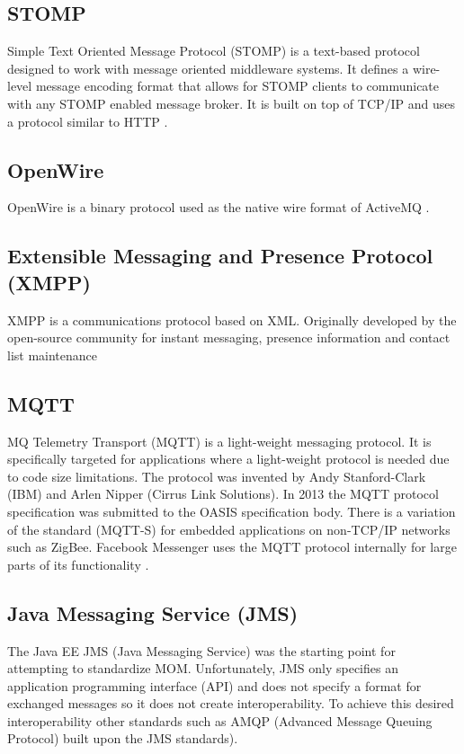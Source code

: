 \documentclass{thesis}
\begin{document}
\subsection{STOMP}
Simple Text Oriented Message Protocol (STOMP) is a text-based protocol designed to work with message oriented middleware systems.  It defines a wire-level message encoding format that allows for STOMP clients to communicate with any STOMP enabled message broker.  It is built on top of TCP/IP and uses a protocol similar to HTTP \cite{STOMP}.

\subsection{OpenWire}
OpenWire is a binary protocol used as the native wire format of ActiveMQ \cite{OPENWIRE}.

\subsection{Extensible Messaging and Presence Protocol (XMPP)}
XMPP is a communications protocol based on XML.  Originally developed by the open-source community for instant messaging, presence information and contact list maintenance \cite{XMPP}  

\subsection{MQTT}
MQ Telemetry Transport (MQTT) is a light-weight messaging protocol.  It is specifically targeted for applications where a light-weight protocol is needed due to code size limitations.  The protocol was invented by Andy Stanford-Clark (IBM) and Arlen Nipper (Cirrus Link Solutions).  In 2013 the MQTT protocol specification was submitted to the OASIS specification body.  There is a variation of the standard (MQTT-S) for embedded applications on non-TCP/IP networks such as ZigBee.  Facebook Messenger uses the MQTT protocol internally for large parts of its functionality \cite{MQTT}. 

\subsection{Java Messaging Service (JMS)}
The Java EE JMS (Java Messaging Service) was the starting point for attempting to standardize MOM. Unfortunately, JMS only specifies an application programming interface (API) and does not specify a format for exchanged messages so it does not create interoperability.   To achieve this desired interoperability other standards such as AMQP (Advanced Message Queuing Protocol) built upon the JMS standards). 
\end{document}
